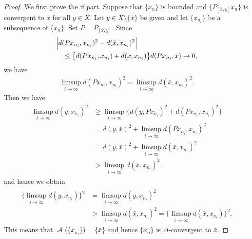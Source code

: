 \documentclass[draft]{amsart}
\numberwithin{equation}{section}
\DeclareMathOperator{\AC}{\mathcal{A}}
\theoremstyle{plain}
\theoremstyle{definition}
\theoremstyle{remark}
\begin{document}
\begin{proof}
 We first prove the if part. 
 Suppose that $\{x_n\}$ is bounded and 
 $\{P_{[\bar{x},y]}x_n\}$ is convergent to $\bar{x}$ 
 for all $y\in X$. Let $y\in X\setminus \{\bar{x}\}$ be given 
 and let $\{x_{n_i}\}$ be a subsequence of $\{x_n\}$. 
 Set $P=P_{[\bar{x},y]}$. 
 Since 
 \begin{align}
 \begin{split}
  &\Bigl\lvert 
  d(Px_{n_i},x_{n_i})^2 - d(\bar{x},x_{n_i})^2
  \Bigr\lvert \\
  &\quad \leq 
  \bigl\{
   d(Px_{n_i},x_{n_i}) + d(\bar{x},x_{n_i})
  \bigr\}
    d(Px_{n_i},\bar{x})  \to 0, 
 \end{split}
 \end{align}
 we have 
 \begin{align}
  \limsup_{i\to \infty}d(Px_{n_i},x_{n_i})^2 
  =\limsup_{i\to \infty}d(\bar{x},x_{n_i})^2. 
 \end{align}
 Then we have 
 \begin{align}
  \begin{split}
   \limsup_{i\to \infty}d(y,x_{n_i})^2 
   &\geq    \limsup_{i\to \infty}
  \bigl\{
   d(y,Px_{n_i})^2 + d(Px_{n_i},x_{n_i})^2 
  \bigr\} \\
   &=    d(y,\bar{x})^2 
 +\limsup_{i\to \infty}
  d(Px_{n_i},x_{n_i})^2 \\
   &=   d(y,\bar{x})^2 
 +\limsup_{i\to \infty}
  d(\bar{x},x_{n_i})^2 \\
   &>
 \limsup_{i\to \infty}
  d(\bar{x},x_{n_i})^2. 
  \end{split}
 \end{align}
and hence we obtain 
\begin{align}
 \begin{split}
\bigl\{\limsup_{i\to \infty}d(y,x_{n_i})\bigr\}^2 
 &=\limsup_{i\to \infty}d(y,x_{n_i})^2 \\
 &> \limsup_{i\to \infty}d(\bar{x},x_{n_i})^2
 = \bigl\{\limsup_{i\to \infty}d(\bar{x},x_{n_i})\bigr\}^2. 
 \end{split}
\end{align}
 This means that 
 $\AC\bigl(\{x_{n_i}\}\bigr)=\{\bar{x}\}$ 
 and hence $\{x_{n}\}$ is $\Delta$-convergent to $\bar{x}$.  


\end{proof}
\end{document}
